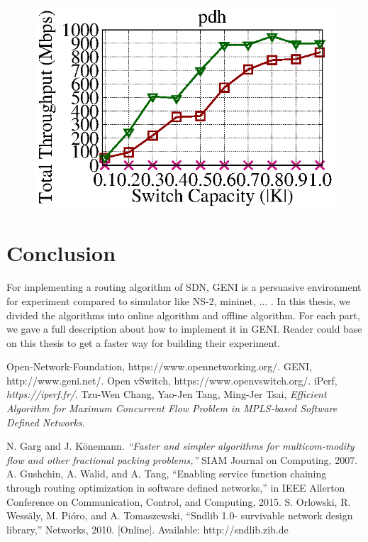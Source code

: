 \documentclass[a4paper,12pt]{report}
\begin{document}
\begin{CJK*}{UTF8}{bkai}
\begin{large}
\begin{figure}[ht]
	  \includegraphics[width=1.0\textwidth]{pdh_geni_throughput_e05.eps}
  \end{figure}
  \chapter{Conclusion}
    \qquad For implementing a routing algorithm of SDN, GENI is a persuasive environment for experiment compared to simulator like NS-2, mininet, ... . In this thesis, we divided the algorithms into online algorithm and offline algorithm. For each part, we gave a full description about how to implement it in GENI.  Reader could base on this thesis to get a faster way for building their experiment. 
 \cleardoublepage
  \begin{thebibliography}{1}
{} 
    Open-Network-Foundation, https://www.opennetworking.org/.
    GENI, http://www.geni.net/.
    Open vSwitch, https://www.openvswitch.org/.
    iPerf, \emph{https://iperf.fr/}.
    Tzu-Wen Chang, Yao-Jen Tang, Ming-Jer Tsai, \emph{Efficient Algorithm for Maximum Concurrent Flow Problem in MPLS-based Software Defined Networks}.
 
    N. Garg and J. Könemann. \emph{“Faster and simpler algorithms for multicom-modity flow and other fractional packing problems,”} SIAM Journal on
Computing, 2007.
	A. Gushchin, A. Walid, and A. Tang, “Enabling service function chaining
through routing optimization in software defined networks,” in IEEE
Allerton Conference on Communication, Control, and Computing, 2015.
	S. Orlowski, R. Wessäly, M. Pióro, and A. Tomaszewski, “Sndlib 1.0-
survivable network design library,” Networks, 2010. [Online]. Available:
http://sndlib.zib.de
\end{thebibliography}
  \end{large}
  \end{CJK*}
  
\end{document}
